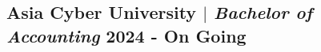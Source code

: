 \documentclass[11pt]{article}
\begin{document}
\subsection{Asia Cyber University $|$ {\normalfont\textit{Bachelor of Accounting}} \hfill 2024 - On Going}

\vspace{0.5\baselineskip}
\end{document}
